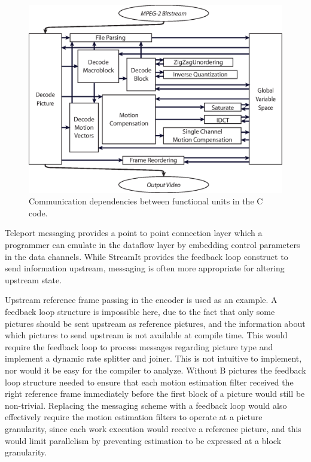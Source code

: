 \begin{figure}[h]
  \begin{center}
    \includegraphics[scale=0.7, angle=0]{./functional_units.eps}
    \caption{Communication dependencies between functional units in the C code.}
    \label{fig:c-arrow-diagram}
  \end{center}
\end{figure}

Teleport messaging provides a point to point connection layer 
which a programmer can emulate in the dataflow layer by 
embedding control parameters in the data channels. While
StreamIt provides the feedback loop construct
to send information upstream, messaging is often more
appropriate for altering upstream state. 

Upstream reference frame passing in the encoder is used as an example. 
A feedback loop structure is impossible here, due to the fact that 
only some pictures should be sent upstream as reference pictures, 
and the information about which pictures to send upstream is not 
available at compile time. This would require the feedback loop to 
process messages regarding picture type and implement a dynamic 
rate splitter and joiner. This is not intuitive to implement, 
nor would it be easy for the compiler to analyze. Without B 
pictures the feedback loop structure needed to ensure that 
each motion estimation filter received the right reference frame 
immediately before the first block of a picture would still be 
non-trivial. Replacing the messaging scheme with a feedback loop 
would also effectively require the motion estimation filters to 
operate at a picture granularity, since each work execution 
would receive a reference picture, and this would limit 
parallelism by preventing estimation to be expressed at a block 
granularity. 


